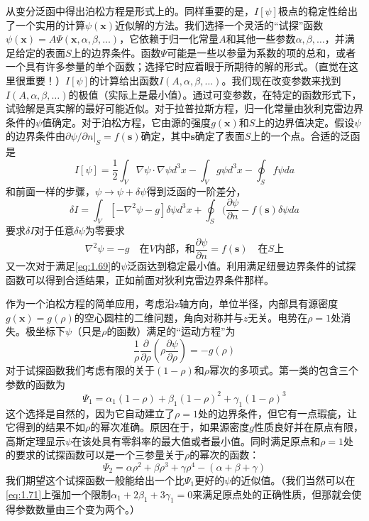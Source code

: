 \documentclass[12pt]{book}
\numberwithin{equation}{chapter}
\numberwithin{figure}{chapter}
\numberwithin{footnote}{page}
\begin{document}
从变分泛函中得出泊松方程是形式上的。同样重要的是，$I[\psi]$极点的稳定性给出了一个实用的计算$\psi(\mathbf{x})$近似解的方法。我们选择一个灵活的“试探”函数$\psi(\mathbf{x})=A\Psi(\mathbf{x},\alpha,\beta,\dots)$，它依赖于归一化常量$A$和其他一些参数$\alpha,\beta,\dots$，并满足给定的表面$S$上的边界条件。函数$\Psi$可能是一些以参量为系数的项的总和，或者一个具有许多参量的单个函数；选择它时应着眼于所期待的解的形式。（直觉在这里很重要！）$I[\psi]$的计算给出函数$I(A,\alpha,\beta,\dots)$。我们现在改变参数来找到$I(A,\alpha,\beta,\dots)$的极值（实际上是最小值）。通过可变参数，在特定的函数形式下，试验解是真实解的最好可能近似。对于拉普拉斯方程，归一化常量由狄利克雷边界条件的$\psi$值确定。对于泊松方程，它由源的强度$g(\mathbf{x})$和$S$上的边界值决定。假设$\psi$的边界条件由$\partial \psi/\partial n|_S=f(\mathbf{s})$确定，其中$\mathbf{s}$确定了表面$S$上的一个点。合适的泛函是
\begin{equation}\label{eq:1.67}
    I[\psi]=\frac{1}{2}\int_V \nabla\psi\cdot\nabla\psi d^3x -\int_V g\psi d^3x-\oint_S f\psi da
\end{equation}
和前面一样的步骤，$\psi\to\psi+\delta\psi$得到泛函的一阶差分，
\begin{equation}\label{eq:1.68}
    \delta I=\int_V[-\nabla^2\psi-g]\delta \psi d^3x+\oint_S (\frac{\partial \psi}{\partial n}-f(\mathbf{s})\delta\psi da
\end{equation}
要求$\delta I$对于任意$\delta \psi$为零要求
\begin{equation}\label{eq:1.69}
    \nabla^2\psi=-g \quad \mbox{在}V\mbox{内部，和}\frac{\partial \psi}{\partial n}=f(\mathbf{s}) \quad \mbox{在}S\mbox{上}
\end{equation}
又一次对于满足\autoref{eq:1.69}的$\psi$泛函达到稳定最小值。利用满足纽曼边界条件的试探函数可以得到合适结果，正如前面对狄利克雷边界条件那样。

作为一个泊松方程的简单应用，考虑沿z轴方向，单位半径，内部具有源密度$g(\mathbf{x})=g(\rho)$的空心圆柱的二维问题，角向对称并与$z$无关。电势在$\rho=1$处消失。极坐标下$\psi$（只是$\rho$的函数）满足的“运动方程”为
\begin{equation}\label{eq:1.70}
    \frac{1}{\rho}\frac{\partial }{\partial \rho}(\rho\frac{\partial \psi}{\partial \rho})=-g(\rho)
\end{equation}
对于试探函数我们考虑有限的关于$(1-\rho)$和$\rho$幂次的多项式。第一类的包含三个参数的函数为
\begin{equation}\label{eq:1.71}
    \Psi_1=\alpha_1(1-\rho)+\beta_1(1-\rho)^2+\gamma_1(1-\rho)^3
\end{equation}
这个选择是自然的，因为它自动建立了$\rho=1$处的边界条件，但它有一点瑕疵，让它得到的结果不如$\rho$的幂次准确。原因在于，如果源密度$g$性质良好并在原点有限，高斯定理显示$\psi$在该处具有零斜率的最大值或者最小值。同时满足原点和$\rho=1$处的要求的试探函数可以是一个三参量关于$\rho$的幂次的函数：
\begin{equation}\label{eq:1.72}
    \Psi_2=\alpha\rho^2+\beta\rho^3+\gamma\rho^4-(\alpha+\beta+\gamma)
\end{equation}
我们期望这个试探函数一般能给出一个比$\Psi_1$更好的$\psi$的近似值。（我们当然可以在\autoref{eq:1.71}上强加一个限制$\alpha_1+2\beta_1+3\gamma_1=0$来满足原点处的正确性质，但那就会使得参数数量由三个变为两个。）
\end{document}
